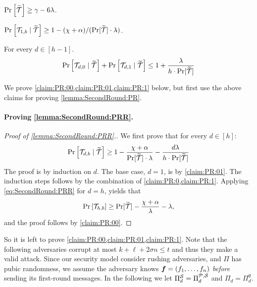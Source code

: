 \begin{claim}\label{claim:PR:00}
$\Pr_{}\left[{\widetilde{\mathcal{T}}}\right] \ge \gamma- 6\lambda$.
\end{claim}


\begin{claim}\label{claim:PR:01}
$\Pr_{}\left[\mathcal{T}_{1,b} \mid {\widetilde{\mathcal{T}}}\right] \ge 1- (\chi + \alpha)/(\Pr[{\widetilde{\mathcal{T}}}]\cdot \lambda)$.
\end{claim}





\begin{claim}\label{claim:PR:1}
For every $d \in [h-1]$.
\[
\Pr_{}\left[\mathcal{T}_{d,0} \mid {\widetilde{\mathcal{T}}}\right] + \Pr_{}\left[\mathcal{T}_{d,1} \mid {\widetilde{\mathcal{T}}}\right] \le 1 + \frac{\lambda}{h\cdot\Pr[{\widetilde{\mathcal{T}}}]}
\]
\end{claim}

We prove \cref{claim:PR:00,claim:PR:01,claim:PR:1} below, but first use the above claims for proving \cref{lemma:SecondRound:PR}.


\paragraph{Proving \cref{lemma:SecondRound:PRR}.}


\begin{proof}[Proof of \cref{lemma:SecondRound:PRR}.]
We first prove that for every $d\in [h]$:
\begin{align}\label{eq:SecondRound:PRR}
\Pr_{}\left[\mathcal{T}_{d,b} \mid {\widetilde{\mathcal{T}}}\right] \ge 1- \frac{ \chi + \alpha}{\Pr[{\widetilde{\mathcal{T}}}]\cdot \lambda} - \frac{d\lambda}{h\cdot\Pr[{\widetilde{\mathcal{T}}}]}
\end{align}	
The proof is by induction on $d$. The base case, $d=1$, is by \cref{claim:PR:01}. The induction steps follows by the combination of \cref{claim:PR:0,claim:PR:1}. Applying \cref{eq:SecondRound:PRR} for $d=h$, yields that
\begin{align*}
\Pr_{}\left[\mathcal{T}_{h,b} \right] \ge \Pr[{\widetilde{\mathcal{T}}}]- \frac{ \chi +\alpha}{\lambda} - \lambda,
\end{align*}	
and the proof follows by \cref{claim:PR:00}.
\end{proof}


\newcommand{\PPP}{\Pi^{\cS}}


So it is left to prove \cref{claim:PR:00,claim:PR:01,claim:PR:1}. Note that the following adversaries corrupt at most $k + \ell + 2\sigma n \le t$ and thus they make a valid attack. Since our security model consider rushing adversaries, and $\Pi$ has
pubic randomness, we assume the adversary knows ${ \boldsymbol{f}} = (f_1,\ldots,f_n)$ \emph{before} sending its first-round messages. In the following we let $\PPP_d = \PP_d$ and $\Pi_d = \Pi^{\emptyset}_d$.

